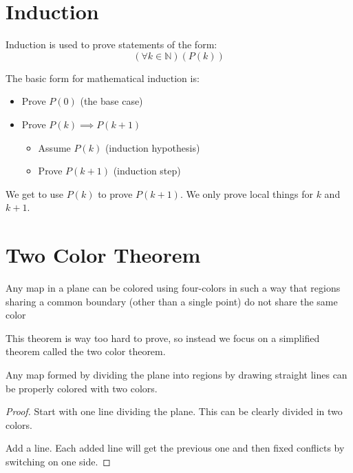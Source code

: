 
\section{Induction}

Induction is used to prove statements of the form:
\begin{equation*}
  (\forall k \in \mathbb{N})(P(k))
\end{equation*}

The basic form for mathematical induction is:
\begin{itemize}
  \item Prove $P(0)$ (the base case)
  \item Prove $P(k) \implies P(k+1)$
  \begin{itemize}
    \item Assume $P(k)$ (induction hypothesis)
    \item Prove $P(k+1)$ (induction step)
  \end{itemize}
\end{itemize}

\begin{note}
  We get to use $P(k)$ to prove $P(k+1)$. We only prove local things for $k$ and
  $k+1$.
\end{note}

\section{Two Color Theorem}

\begin{thm}
  Any map in a plane can be colored using four-colors in such a way that
  regions sharing a common boundary (other than a single point) do not share
  the same color
\end{thm}

This theorem is way too hard to prove, so instead we focus on a simplified
theorem called the two color theorem.

\begin{thm}
  Any map formed by dividing the plane into regions by drawing straight lines
  can be properly colored with two colors.
\end{thm}


\begin{proof}
  Start with one line dividing the plane. This can be clearly divided in two
  colors.

  Add a line. Each added line will get the previous one and then fixed
  conflicts by switching on one side.
\end{proof}
